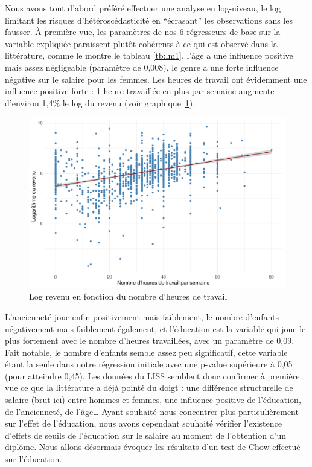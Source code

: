 \documentclass[a4paper, french, 11 pt]{article}\usepackage[]{graphicx}\usepackage[]{xcolor}
\makeatletter
\newenvironment{kframe}{%
 \def\at@end@of@kframe{}%
 \ifinner\ifhmode%
  \def\at@end@of@kframe{\end{minipage}}%
  \begin{minipage}{\columnwidth}%
 \fi\fi%
 \def\FrameCommand##1{\hskip\@totalleftmargin \hskip-\fboxsep
 \colorbox{shadecolor}{##1}\hskip-\fboxsep
     \hskip-\linewidth \hskip-\@totalleftmargin \hskip\columnwidth}%
 \MakeFramed {\advance\hsize-\width
   \@totalleftmargin\z@ \linewidth\hsize
   \@setminipage}}%
 {\par\unskip\endMakeFramed%
 \at@end@of@kframe}
\newenvironment{knitrout}{}{} %
\makeatother
\begin{document}
Nous avons tout d’abord préféré effectuer une analyse en log-niveau, le log limitant les risques d’hétéroscédasticité en \enquote{écrasant} les observations sans les fausser. À première vue, les paramètres de nos 6 régresseurs de base sur la variable expliquée paraissent plutôt cohérents à ce qui est observé dans la littérature, comme le montre le tableau \ref{tb:lm1}, l’âge a une influence positive mais assez négligeable (paramètre de 0,008), le genre a une forte influence négative sur le salaire pour les femmes. Les heures de travail ont évidemment une influence positive forte : 1 heure travaillée en plus par semaine augmente d’environ 1,4\% le log du revenu (voir graphique~\ref{fig:heureslogrevenu}).

\begin{knitrout}
\color{fgcolor}\begin{kframe}


{\ttfamily\noindent\itshape{}}\end{kframe}
\end{knitrout}

\begin{figure}[h]
\center
\includegraphics[width=0.7\linewidth]{figure/heures_logrevenu.pdf}
\caption{Log revenu en fonction du nombre d'heures de travail\label{fig:heureslogrevenu}}
\end{figure}

L’ancienneté joue enfin positivement mais faiblement, le nombre d’enfants négativement mais faiblement également, et l’éducation est la variable qui joue le plus fortement avec le nombre d’heures travaillées, avec un paramètre de 0,09. Fait notable, le nombre d’enfants semble assez peu significatif, cette variable étant la seule dans notre régression initiale avec une p-value supérieure à 0,05 (pour atteindre 0,45).
        Les données du LISS semblent donc confirmer à première vue ce que la littérature a déjà pointé du doigt : une différence structurelle de salaire (brut ici) entre hommes et femmes, une influence positive de l’éducation, de l’ancienneté, de l’âge… Ayant souhaité nous concentrer plus particulièrement sur l’effet de l’éducation, nous avons cependant souhaité vérifier l’existence d'effets de seuils de l’éducation sur le salaire au moment de l’obtention d’un diplôme. Nous allons désormais évoquer les résultats d’un test de Chow effectué sur l’éducation. 
\end{document}
